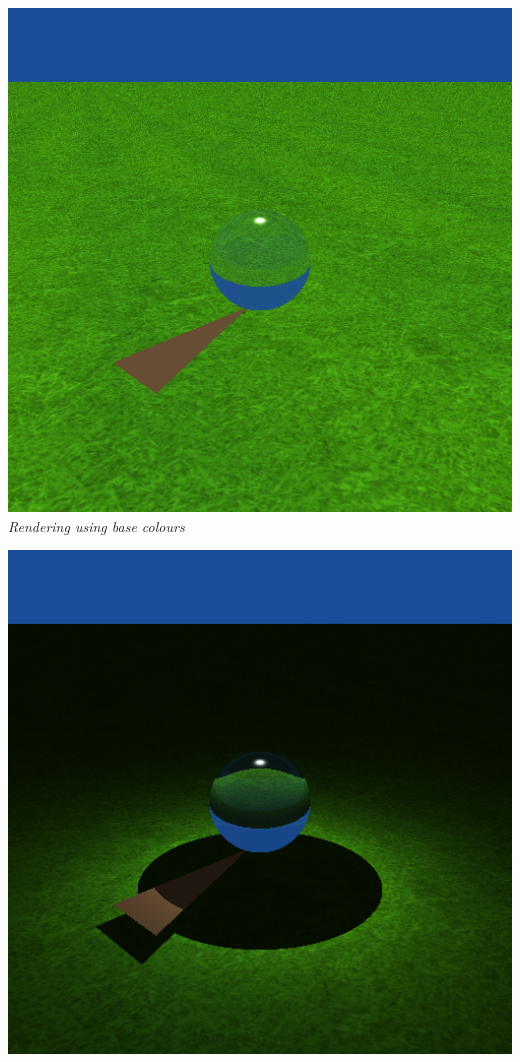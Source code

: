 \documentclass[a4,12pt]{article}
\begin{document}
	\begin{center}
		\begin{minipage}[b]{0.40\linewidth}
			\begin{center}
				\includegraphics[width = \textwidth]{./Worksheet3/TexturesRenderingFlat.png}\\
				\textit{Rendering using base colours}\\
				\hspace{1em}
			\end{center}
		\end{minipage}
		\hspace{0.05\linewidth}
		\begin{minipage}[b]{0.40\linewidth}
			\begin{center}
				\includegraphics[width =\textwidth]{./Worksheet3/TexturesRenderingShadows.png}\\

\end{center}
\end{minipage}
\end{center}
\end{document}
